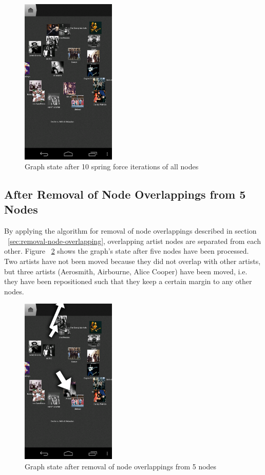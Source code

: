 \begin{figure}[H]
  \centering
    \includegraphics[width=0.4\textwidth]{figures/screen_mds_7_after_10_cleanup_iterations}
  \caption{Graph state after 10 spring force iterations of all nodes}
  \label{fig:screen_mds_7_after_10_cleanup_iterations}
\end{figure}

\newpage
\subsection{After Removal of Node Overlappings from 5 Nodes}

By applying the algorithm for removal of node overlappings described in section ~\ref{sec:removal-node-overlapping}, overlapping artist nodes are separated from each other. Figure ~\ref{fig:screen_mds_8_after_5_uncollided_nodes} shows the graph's state after five nodes have been processed. Two artists have not been moved because they did not overlap with other artists, but three artists (Aerosmith, Airbourne, Alice Cooper) have been moved, i.e. they have been repositioned such that they keep a certain margin to any other nodes.

\begin{figure}[H]
  \centering
    \includegraphics[width=0.4\textwidth]{figures/screen_mds_8_after_5_uncollided_nodes}
  \caption{Graph state after removal of node overlappings from 5 nodes}
  \label{fig:screen_mds_8_after_5_uncollided_nodes}
\end{figure}


